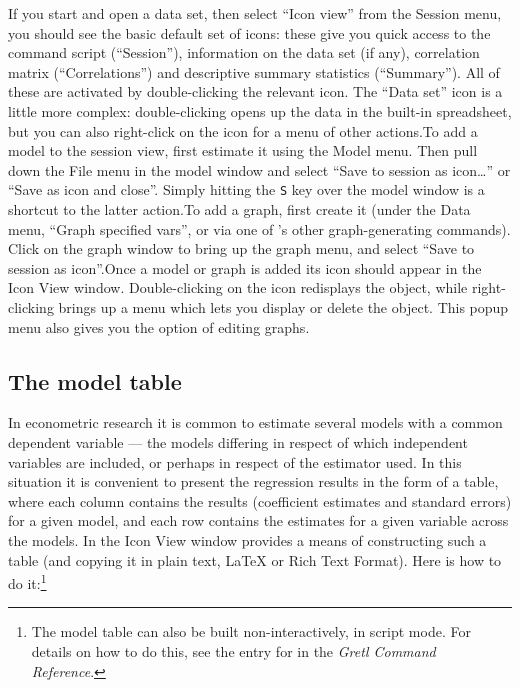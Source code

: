 If you start  and open a data set, then select ``Icon
view'' from the Session menu, you should see the basic default set of
icons: these give you quick access to the command script
(``Session''), information on the data set (if any), correlation
matrix (``Correlations'') and descriptive summary statistics
(``Summary''). All of these are activated by double-clicking the
relevant icon.  The ``Data set'' icon is a little more complex:
double-clicking opens up the data in the built-in spreadsheet, but you
can also right-click on the icon for a menu of other actions.To add a
model to the session view, first estimate it using the Model menu.
Then pull down the File menu in the model window and select ``Save to
session as icon\dots{}'' or ``Save as icon and close''.  Simply
hitting the \verb+S+ key over the model window is a shortcut to the
latter action.To add a graph, first create it (under the Data menu,
``Graph specified vars'', or via one of 's other
graph-generating commands).  Click on the graph window to bring up the
graph menu, and select ``Save to session as icon''.Once a model or
graph is added its icon should appear in the Icon View window.
Double-clicking on the icon redisplays the object, while
right-clicking brings up a menu which lets you display or delete the
object.  This popup menu also gives you the option of editing graphs.

\subsection{The model table}
\label{model-table}


In econometric research it is common to estimate several models with a
common dependent variable --- the models differing in respect of which
independent variables are included, or perhaps in respect of the
estimator used.  In this situation it is convenient to present the
regression results in the form of a table, where each column contains
the results (coefficient estimates and standard errors) for a given
model, and each row contains the estimates for a given variable across
the models.  In the Icon View window  provides a means of
constructing such a table (and copying it in plain text, {\LaTeX} or
Rich Text Format).  Here is how to do it:\footnote{The model table can
  also be built non-interactively, in script mode.  For details on how
  to do this, see the entry for  in the \emph{Gretl
    Command Reference}.  }
      
